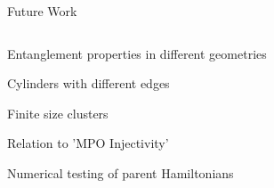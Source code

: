 \begin{frame}{Future Work}
\vskip-1.5cm

\begin{columns}[T]
    \begin{column}[T]{.5\textwidth}

\begin{block}{}
	\bi
	\item Entanglement properties in different geometries
		\bi
		\item Cylinders with different edges
		\item Finite size clusters 
		\ei
	\item Relation to 'MPO Injectivity'
	  \bi
	  \item 
	  \ei
	\item Numerical testing of parent Hamiltonians
		\bi
		\item 
		\ei
	\ei	
\end{block}

    \end{column}
    \begin{column}[T]{.5\textwidth}
    \end{column}
\end{columns}
\end{frame}